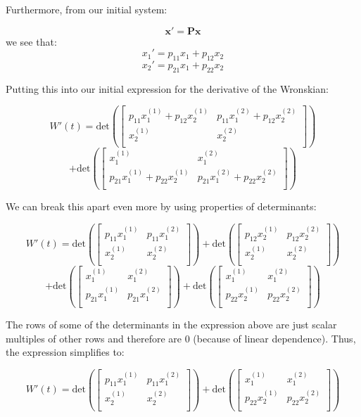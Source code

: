 \documentclass{report}
\begin{document}
Furthermore, from our initial system:

$$\mathbf{x'} = \mathbf{Px}$$
we see that:
$$x_1' = p_{11}x_1 + p_{12}x_2$$
$$x_2' = p_{21}x_1 + p_{22}x_2$$

Putting this into our initial expression for the derivative of the Wronskian:

$$
W'(t) =
\text{det}\left(
\begin{bmatrix}
    p_{11}x_1^{(1)} + p_{12}x_2^{(1)} & p_{11}x_1^{(2)} + p_{12}x_2^{(2)} \\
    x_2^{(1)} & x_2^{(2)} \\
\end{bmatrix}\right)
$$
$$
+
\text{det}\left(
\begin{bmatrix}
    x_1^{(1)} & x_1^{(2)} \\
    p_{21}x_1^{(1)} + p_{22}x_2^{(1)} & p_{21}x_1^{(2)} + p_{22}x_2^{(2)} \\
\end{bmatrix}\right)
$$

We can break this apart even more by using properties of determinants:

$$
W'(t) =
\text{det}\left(
\begin{bmatrix}
    p_{11}x_1^{(1)} & p_{11}x_1^{(2)} \\
    x_2^{(1)} & x_2^{(2)} \\
\end{bmatrix}\right)
+
\text{det}\left(
\begin{bmatrix}
     p_{12}x_2^{(1)} &  p_{12}x_2^{(2)} \\
    x_2^{(1)} & x_2^{(2)} \\
\end{bmatrix}\right)
$$
$$
+
\text{det}\left(
\begin{bmatrix}
    x_1^{(1)} & x_1^{(2)} \\
    p_{21}x_1^{(1)} & p_{21}x_1^{(2)} \\
\end{bmatrix}\right)
+
\text{det}\left(
\begin{bmatrix}
    x_1^{(1)} & x_1^{(2)} \\
    p_{22}x_2^{(1)} &  p_{22}x_2^{(2)} \\
\end{bmatrix}\right)
$$

The rows of some of the determinants in the expression above are just scalar multiples of other rows and therefore are 0 (because of linear dependence). Thus, the expression simplifies to:

$$
W'(t) =
\text{det}\left(
\begin{bmatrix}
    p_{11}x_1^{(1)} & p_{11}x_1^{(2)} \\
    x_2^{(1)} & x_2^{(2)} \\
\end{bmatrix}\right)
+
\text{det}\left(
\begin{bmatrix}
    x_1^{(1)} & x_1^{(2)} \\
    p_{22}x_2^{(1)} &  p_{22}x_2^{(2)} \\
\end{bmatrix}\right)
$$
\end{document}
